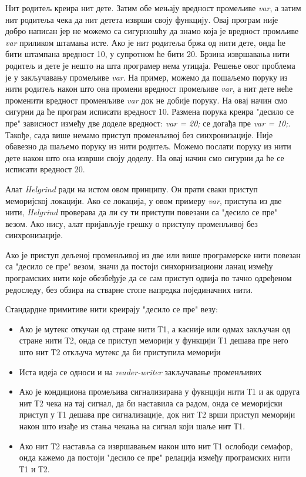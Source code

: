 \documentclass[12pt,oneside]{memoir}
\begin{document}
\indent Нит родитељ креира нит дете. Затим обе мењају вредност промељиве \textit{var}, а затим нит родитеља чека да нит детета изврши своју функцију. Овај програм није добро написан јер не можемо са сигурношћу да знамо која је вредност промљиве \textit{var} приликом штамања исте. Ако је нит родитеља бржа од нити дете, онда ће бити штампана вредност 10, у супротном ће бити 20. Брзина извршавања нити родитељ и дете је нешто на шта програмер нема утицаја. Решење овог проблема је у закључавању промељиве \textit{var}. На пример, можемо да пошаљемо поруку из нити родитељ након што она промени вредност промељиве \textit{var}, а нит дете неће променити вредност променљиве \textit{var} док не добије поруку. На овај начин смо сигурни  да ће програм исписати вредност 10. Размена порука креира "десило се пре" зависност између две доделе вредност: \textit{var = 20;} се догађа пре \textit{var = 10;}. Такође, сада више немамо приступ променљивој без синхронизације. Није обавезно да шаљемо поруку из нити родитељ. Можемо послати поруку из нити дете након што она изврши своју доделу. На овај начин смо сигурни да ће се исписати вредност 20.

\indent Алат \textit{Helgrind} ради на истом овом принципу. Он прати сваки приступ меморијској локацији. Ако се локација, у овом примеру \textit{var}, приступа из две нити, \textit{Helgrind} проверава да ли су ти приступи повезани са "десило се пре" везом. Ако нису, алат пријављује грешку о приступу променљивој без синхронизације.

\indent Ако је приступ дељеној променљивој из две или више програмерске нити повезан са "десило се пре" везом, значи да постоји синхорнизациони ланац између програмских нити које обезбеђује да се сам приступ одвија по тачно одређеном редоследу, без обзира на стварне стопе напредка појединачних нити.

\indent Стандардне примитиве нити креирају "десило се пре" везу:
\begin{itemize}
  \item Ако је мутекс откучан од стране нити Т1, а касније или одмах закључан од стране нити Т2, онда се приступ меморији у функцији Т1 дешава пре него што нит Т2 откључа мутекс да би приступила меморији
  \item Иста идеја се односи и на \textit{reader-writer} закључавање променљивих
  \item Ако је кондициона промељива сигнализирана у фукнцији нити Т1 и ак одруга нит Т2 чека на тај сигнал, да би наставила са радом, онда се меморијски приступ у Т1 дешава пре сигнализације, док нит Т2 врши приступ меморији након што изађе из стања чекања на сигнал који шаље нит Т1.
  \item Ако нит Т2 наставља са извршавањем након што нит Т1 ослободи семафор, онда кажемо да постоји "десило се пре" релација између програмских нити Т1 и Т2.
\end{itemize}
\end{document}
